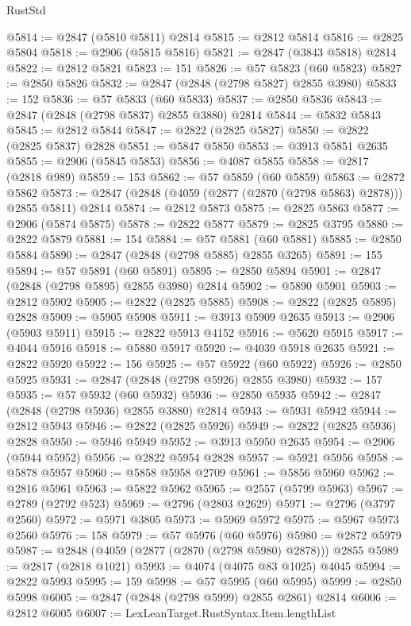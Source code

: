 \begin{lexlean}{RustStd}
\begin{coremodule}
@5814 := @2847 (@5810 @5811) @2814
@5815 := @2812 @5814
@5816 := @2825 @5804
@5818 := @2906 (@5815 @5816)
@5821 := @2847 (@3843 @5818) @2814
@5822 := @2812 @5821
@5823 := 151
@5826 := @57 @5823 (@60 @5823)
@5827 := @2850 @5826
@5832 := @2847 (@2848 (@2798 @5827) @2855 @3980)
@5833 := 152
@5836 := @57 @5833 (@60 @5833)
@5837 := @2850 @5836
@5843 := @2847 (@2848 (@2798 @5837) @2855 @3880) @2814
@5844 := @5832 @5843
@5845 := @2812 @5844
@5847 := @2822 (@2825 @5827)
@5850 := @2822 (@2825 @5837) @2828
@5851 := @5847 @5850
@5853 := @3913 @5851 @2635
@5855 := @2906 (@5845 @5853)
@5856 := @4087 @5855
@5858 := @2817 (@2818 @989)
@5859 := 153
@5862 := @57 @5859 (@60 @5859)
@5863 := @2872 @5862
@5873 := @2847 (@2848 (@4059 (@2877 (@2870 (@2798 @5863) @2878))) @2855 @5811) @2814
@5874 := @2812 @5873
@5875 := @2825 @5863
@5877 := @2906 (@5874 @5875)
@5878 := @2822 @5877
@5879 := @2825 @3795
@5880 := @2822 @5879
@5881 := 154
@5884 := @57 @5881 (@60 @5881)
@5885 := @2850 @5884
@5890 := @2847 (@2848 (@2798 @5885) @2855 @3265)
@5891 := 155
@5894 := @57 @5891 (@60 @5891)
@5895 := @2850 @5894
@5901 := @2847 (@2848 (@2798 @5895) @2855 @3980) @2814
@5902 := @5890 @5901
@5903 := @2812 @5902
@5905 := @2822 (@2825 @5885)
@5908 := @2822 (@2825 @5895) @2828
@5909 := @5905 @5908
@5911 := @3913 @5909 @2635
@5913 := @2906 (@5903 @5911)
@5915 := @2822 @5913 @4152
@5916 := @5620 @5915
@5917 := @4044 @5916
@5918 := @5880 @5917
@5920 := @4039 @5918 @2635
@5921 := @2822 @5920
@5922 := 156
@5925 := @57 @5922 (@60 @5922)
@5926 := @2850 @5925
@5931 := @2847 (@2848 (@2798 @5926) @2855 @3980)
@5932 := 157
@5935 := @57 @5932 (@60 @5932)
@5936 := @2850 @5935
@5942 := @2847 (@2848 (@2798 @5936) @2855 @3880) @2814
@5943 := @5931 @5942
@5944 := @2812 @5943
@5946 := @2822 (@2825 @5926)
@5949 := @2822 (@2825 @5936) @2828
@5950 := @5946 @5949
@5952 := @3913 @5950 @2635
@5954 := @2906 (@5944 @5952)
@5956 := @2822 @5954 @2828
@5957 := @5921 @5956
@5958 := @5878 @5957
@5960 := @5858 @5958 @2709
@5961 := @5856 @5960
@5962 := @2816 @5961
@5963 := @5822 @5962
@5965 := @2557 (@5799 @5963)
@5967 := @2789 (@2792 @523)
@5969 := @2796 (@2803 @2629)
@5971 := @2796 (@3797 @2560)
@5972 := @5971 @3805
@5973 := @5969 @5972
@5975 := @5967 @5973 @2560
@5976 := 158
@5979 := @57 @5976 (@60 @5976)
@5980 := @2872 @5979
@5987 := @2848 (@4059 (@2877 (@2870 (@2798 @5980) @2878))) @2855
@5989 := @2817 (@2818 @1021)
@5993 := @4074 (@4075 @83 @1025) @4045
@5994 := @2822 @5993
@5995 := 159
@5998 := @57 @5995 (@60 @5995)
@5999 := @2850 @5998
@6005 := @2847 (@2848 (@2798 @5999) @2855 @2861) @2814
@6006 := @2812 @6005
@6007 := LexLeanTarget.RustSyntax.Item.lengthList

\end{coremodule}
\end{lexlean}
